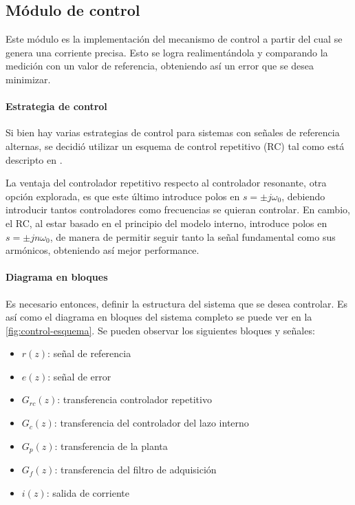 \documentclass[../et.tex]{subfiles}
\begin{document}
\subsection{Módulo de control}
Este módulo es la implementación del mecanismo de control a partir del cual se genera una corriente precisa. Esto se logra realimentándola y comparando la medición con un valor de referencia, obteniendo así un error que se desea minimizar.

\paragraph{Estrategia de control}
Si bien hay varias estrategias de control para sistemas con señales de referencia alternas, se decidió utilizar un esquema de control repetitivo (RC) tal como está descripto en \cite{control-lic}.

La ventaja del controlador repetitivo respecto al controlador resonante, otra opción explorada, es que este último introduce polos en $s = \pm j\omega_0$, debiendo introducir tantos controladores como frecuencias se quieran controlar. En cambio, el RC, al estar basado en el principio del modelo interno, introduce polos en $s = \pm jn\omega_0$, de manera de permitir seguir tanto la señal fundamental como sus armónicos, obteniendo así mejor performance.

\paragraph{Diagrama en bloques}
Es necesario entonces, definir la estructura del sistema que se desea controlar. Es así como el diagrama en bloques del sistema completo se puede ver en la \autoref{fig:control-esquema}. Se pueden observar los siguientes bloques y señales:
    \begin{itemize}
        \item $r(z)$: señal de referencia
        \item $e(z)$: señal de error
        \item $G_{rc}(z)$: transferencia controlador repetitivo
        \item $G_c(z)$: transferencia del controlador del lazo interno
        \item $G_p(z)$: transferencia de la planta
        \item $G_f(z)$: transferencia del filtro de adquisición
        \item $i(z)$: salida de corriente
    \end{itemize}
\end{document}
